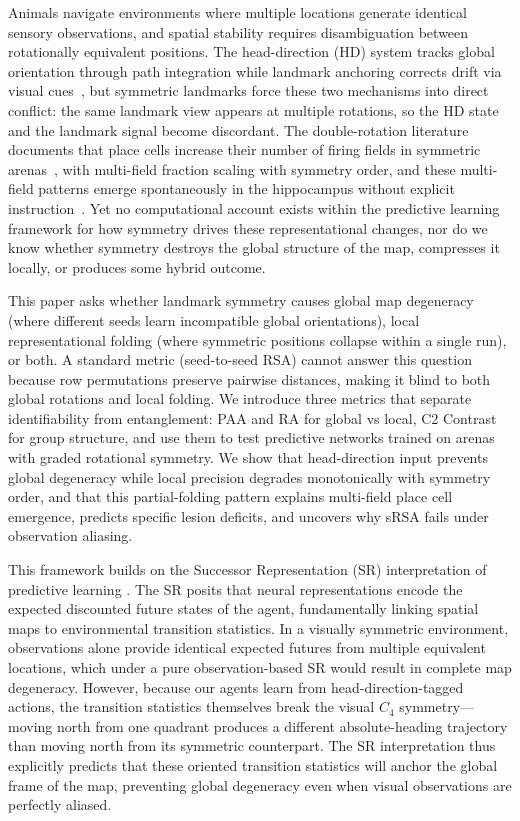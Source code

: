 \documentclass[11pt, a4paper]{article}
\begin{document}
Animals navigate environments where multiple locations generate identical sensory observations, and spatial stability requires disambiguation between rotationally equivalent positions. The head-direction (HD) system tracks global orientation through path integration while landmark anchoring corrects drift via visual cues~\cite{taube1990, knierim1995}, but symmetric landmarks force these two mechanisms into direct conflict: the same landmark view appears at multiple rotations, so the HD state and the landmark signal become discordant. The double-rotation literature documents that place cells increase their number of firing fields in symmetric arenas~\cite{muller1987, knierim1995}, with multi-field fraction scaling with symmetry order, and these multi-field patterns emerge spontaneously in the hippocampus without explicit instruction~\cite{leutgeb2005}. Yet no computational account exists within the predictive learning framework for how symmetry drives these representational changes, nor do we know whether symmetry destroys the global structure of the map, compresses it locally, or produces some hybrid outcome.

This paper asks whether landmark symmetry causes global map degeneracy (where different seeds learn incompatible global orientations), local representational folding (where symmetric positions collapse within a single run), or both. A standard metric (seed-to-seed RSA) cannot answer this question because row permutations preserve pairwise distances, making it blind to both global rotations and local folding. We introduce three metrics that separate identifiability from entanglement: PAA and RA for global vs local, C2 Contrast for group structure, and use them to test predictive networks trained on arenas with graded rotational symmetry. We show that head-direction input prevents global degeneracy while local precision degrades monotonically with symmetry order, and that this partial-folding pattern explains multi-field place cell emergence, predicts specific lesion deficits, and uncovers why sRSA fails under observation aliasing.

This framework builds on the Successor Representation (SR) interpretation of predictive learning \cite{stachenfeld2017, levenstein2024}. The SR posits that neural representations encode the expected discounted future states of the agent, fundamentally linking spatial maps to environmental transition statistics. In a visually symmetric environment, observations alone provide identical expected futures from multiple equivalent locations, which under a pure observation-based SR would result in complete map degeneracy. However, because our agents learn from head-direction-tagged actions, the transition statistics themselves break the visual $C_4$ symmetry---moving north from one quadrant produces a different absolute-heading trajectory than moving north from its symmetric counterpart. The SR interpretation thus explicitly predicts that these oriented transition statistics will anchor the global frame of the map, preventing global degeneracy even when visual observations are perfectly aliased.
\end{document}
